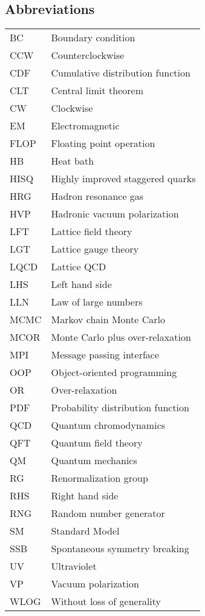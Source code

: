 \documentclass[12pt]{book}
\theoremstyle{definition}
\newenvironment{frontstuff}
  {\centering\chapter*{}}
  {\clearpage}
\begin{document}
\begin{frontstuff}
\section*{Abbreviations}
\begin{tabular}{ll}
BC      &       Boundary condition \\
CCW     &       Counterclockwise\\
CDF     &       Cumulative distribution function \\
CLT     &       Central limit theorem\\
CW      &       Clockwise\\
EM      &       Electromagnetic\\
FLOP    &       Floating point operation\\
HB      &       Heat bath\\
HISQ    &       Highly improved staggered quarks\\
HRG     &       Hadron resonance gas\\
HVP     &       Hadronic vacuum polarization\\
LFT     &       Lattice field theory\\
LGT     &       Lattice gauge theory\\
LQCD    &       Lattice QCD\\
LHS     &       Left hand side\\
LLN     &       Law of large numbers\\
MCMC    &       Markov chain Monte Carlo\\
MCOR    &       Monte Carlo plus over-relaxation \\
MPI     &       Message passing interface \\
OOP     &       Object-oriented programming \\
OR      &       Over-relaxation \\
PDF     &       Probability distribution function \\
QCD     &       Quantum chromodynamics \\
QFT     &       Quantum field theory \\
QM      &       Quantum mechanics \\
RG      &       Renormalization group \\
RHS     &       Right hand side \\
RNG     &       Random number generator \\
SM      &       Standard Model \\
SSB     &       Spontaneous symmetry breaking\\
UV      &       Ultraviolet \\
VP      &       Vacuum polarization \\
WLOG    &       Without loss of generality
\end{tabular}
\clearpage



\end{frontstuff}
\end{document}
